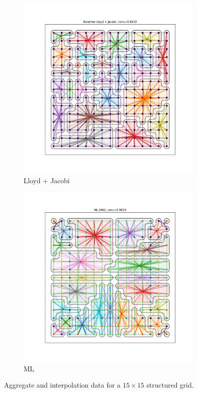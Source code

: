 \documentclass{article}
\begin{document}
\begin{figure}[h]
  \centering
  \begin{subfigure}[t]{0.49\textwidth}
    \centering
    \includegraphics[width=\textwidth]{grid_15_lloyd.pdf}
    \caption{Lloyd + Jacobi}
  \end{subfigure}
  \begin{subfigure}[t]{0.49\textwidth}
    \centering
    \includegraphics[width=\textwidth]{grid_15_ml.pdf}
    \caption{ML}
  \end{subfigure}
  \caption{Aggregate and interpolation data for a $15 \times 15$ structured grid.}
  \label{fig:grid15}
\end{figure}
\end{document}
